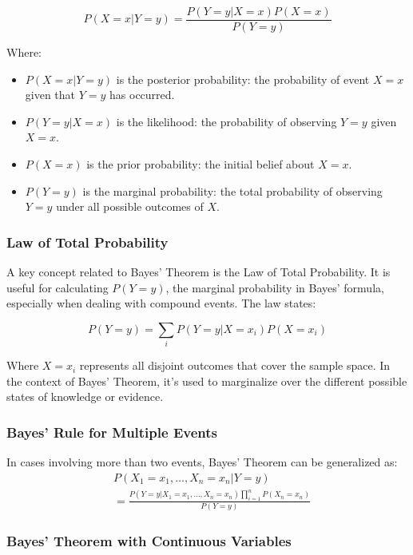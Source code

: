 \documentclass[8pt, a4paper, landscape, includeheadfoot]{extarticle}
\begin{document}
\begin{multicols*}{4}
	$$
		P(X{=}x | Y{=}y) = \frac{P(Y{=}y | X{=}x) P(X{=}x)}{P(Y{=}y)}
	$$

	Where:
	\begin{itemize}
		\item $P(X{=}x | Y{=}y)$ is the posterior probability: the probability of event $X{=}x$ given that $Y{=}y$ has occurred.
		\item $P(Y{=}y | X{=}x)$ is the likelihood: the probability of observing $Y{=}y$ given $X{=}x$.
		\item $P(X{=}x)$ is the prior probability: the initial belief about $X{=}x$.
		\item $P(Y{=}y)$ is the marginal probability: the total probability of observing $Y{=}y$ under all possible outcomes of $X$.
	\end{itemize}
	\subsubsection{Law of Total Probability}

	A key concept related to Bayes' Theorem is the Law of Total Probability. It is useful for calculating $P(Y{=}y)$, the marginal probability in Bayes' formula, especially when dealing with compound events. The law states:

	$$
		P(Y{=}y) = \sum_{i} P(Y{=}y | X{=}x_i) P(X{=}x_i)
	$$

	Where $X{=}x_i$ represents all disjoint outcomes that cover the sample space. In the context of Bayes' Theorem, it's used to marginalize over the different possible states of knowledge or evidence.

	\subsubsection{Bayes' Rule for Multiple Events}

	In cases involving more than two events, Bayes' Theorem can be generalized as:
	\begin{align*}
		 & P(X_1{=}x_1, \ldots, X_n{=}x_n | Y{=}y)                                                \\
		 & = \frac{P(Y{=}y | X_1{=}x_1, \ldots, X_n{=}x_n)\prod_{i=1}^{n} P(X_n{=}x_n)}{P(Y{=}y)}
	\end{align*}

	\subsubsection{Bayes' Theorem with Continuous Variables}


\end{multicols*}
\end{document}
